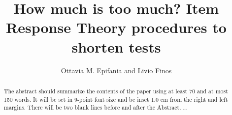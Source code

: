 \documentclass{svproc}
\begin{document}
\mainmatter              %
%
\title{How much is too much? Item Response Theory procedures to shorten tests}
%
%
\author{Ottavia M. Epifania and Livio Finos}
%
%
%

\maketitle              %

\begin{abstract}
The abstract should summarize the contents of the paper
using at least 70 and at most 150 words. It will be set in 9-point
font size and be inset 1.0 cm from the right and left margins.
There will be two blank lines before and after the Abstract. \dots
\end{abstract}
%
\end{document}
